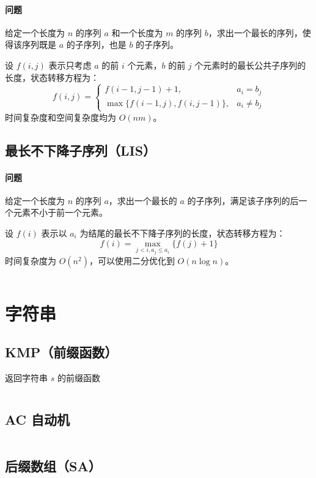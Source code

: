 \documentclass[a4paper, twoside]{article}
\begin{document}
\paragraph{问题}给定一个长度为 $n$ 的序列 $a$ 和一个长度为 $m$ 的序列 $b$，求出一个最长的序列，使得该序列既是 $a$ 的子序列，也是 $b$ 的子序列。

设 $f(i, j)$ 表示只考虑 $a$ 的前 $i$ 个元素，$b$ 的前 $j$ 个元素时的最长公共子序列的长度，状态转移方程为：
$$
f(i, j) = \begin{cases}
    f(i-1, j-1)+1, & a_i = b_j \\
    \max\{f(i-1, j), f(i, j-1)\}, & a_i\neq b_j
\end{cases}
$$
时间复杂度和空间复杂度均为 $O(nm)$。

\subsection{最长不下降子序列（LIS）}
\paragraph{问题}给定一个长度为 $n$ 的序列 $a$，求出一个最长的 $a$ 的子序列，满足该子序列的后一个元素不小于前一个元素。

设 $f(i)$ 表示以 $a_i$ 为结尾的最长不下降子序列的长度，状态转移方程为：
$$
f(i) = \max \limits_{j < i, a_j \leq a_i}\{f(j) + 1\}
$$
时间复杂度为 $O(n^2)$，可以使用二分优化到 $O(n\log n)$。
\inputminted{cpp}{../src/动态规划/最长不下降子序列（LIS）.cpp}



\newpage
\section{字符串}
\subsection{KMP（前缀函数）}
返回字符串 $s$ 的前缀函数
\inputminted{cpp}{../src/字符串/KMP（前缀函数）.cpp}

\subsection{AC 自动机}
\inputminted{cpp}{../src/字符串/AC自动机.cpp}

\subsection{后缀数组（SA）}
\inputminted{cpp}{../src/字符串/后缀数组（SA）.cpp}
\end{document}
